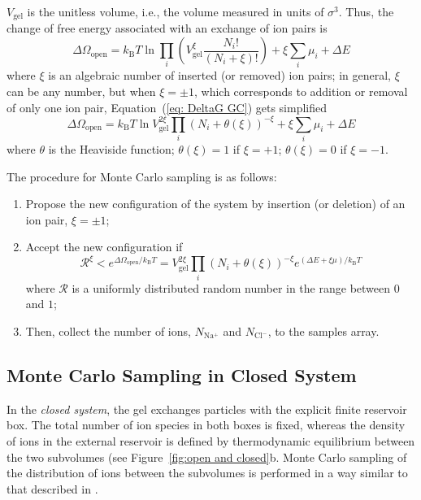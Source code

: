 \documentclass[gels,article,accept,pdftex,moreauthors]{Definitions/mdpi}
\newcommand{\ie}{{i.e.,} }
\newcommand{\kT}{k_\mathrm{B}T}
\newcommand{\Nna}{N_\mathrm{Na^+}}
\newcommand{\Ncl}{N_\mathrm{Cl^-}}
\newcommand{\Vgel}{V_\mathrm{gel}}
\newcommand{\reffig}[1]{Figure~\ref{#1}}
\newcommand{\refeq}[1]{Equation~(\ref{#1}){}}
\begin{document}
$\Vgel$ is the unitless volume, \ie the volume measured in units of $\sigma^3$. 
Thus, the change of free energy associated with an exchange of ion pairs is
\begin{equation}
\Delta\Omega_\mathrm{open}=\kT\ln\prod_i\left(\Vgel^{\xi}\frac{N_i!}{\left(N_i+\xi\right)!}\right)+\xi\sum_i\mu_i+\Delta E
\label{eq: DeltaG GC}
\end{equation}
where $\xi$ is an algebraic number of inserted (or removed) ion pairs; in general, $\xi$ can be any number, but when $\xi = \pm 1$, which corresponds to addition or removal of only one ion pair,  \refeq{eq: DeltaG GC} gets simplified
\begin{equation}
    \Delta\Omega_\mathrm{open}=\kT\ln \Vgel^{2\xi} \prod_i \left(N_i+\theta(\xi)\right)^{-\xi}+\xi\sum_i\mu_i+\Delta E
\label{eq: DeltaG GC_simpl}
\end{equation}
where $\theta$ is the Heaviside function; $\theta(\xi) = 1$ if $\xi=+1$; $\theta(\xi) = 0$ if $\xi=-1$.

The procedure for Monte Carlo sampling is as follows: \cite{Frenlkel2002_book}
\begin{enumerate}
	\item Propose the new configuration of the system by insertion (or deletion) of an ion pair, $\xi=\pm1$;
	\item Accept the new configuration if
	\begin{equation}
        \mathcal{R}^{\xi}<e^{\Delta\Omega_\mathrm{open}/\kT}=\Vgel^{2\xi} \prod_i \left(N_i+\theta(\xi)\right)^{-\xi}e^{\left(\Delta E+\xi\mu\right)/\kT}\label{eq: GC acceptance}
	\end{equation}
	where $\mathcal{R}$ is a uniformly distributed random number in the range between $0$ and $1$;
	\item Then, collect the number of ions, $\Nna$ and $\Ncl$, to the samples array.
\end{enumerate}


\subsection{Monte Carlo Sampling in Closed System}

In the \emph{closed system}, the gel exchanges particles with the explicit finite reservoir box. 
The total number of ion species in both boxes is fixed, whereas the density of ions in the external reservoir is defined by thermodynamic equilibrium between the two subvolumes (see \reffig{fig:open and closed}b. Monte Carlo sampling of the distribution of ions between the subvolumes is performed in a way similar to that described in \cite{Panagiotopoulos1988b, Erdos2020}. 
\end{document}
